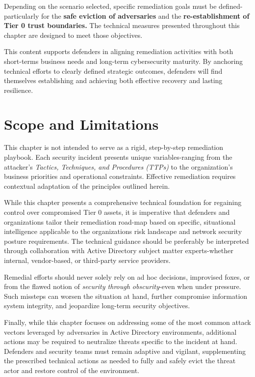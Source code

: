 Depending on the scenario selected, specific remediation goals must be defined-particularly for the \textbf{safe eviction of adversaries} and the \textbf{re-establishment of Tier 0 trust boundaries.} The technical measures presented throughout this chapter are designed to meet those objectives.

This content supports defenders in aligning remediation activities with both short-terms business needs and long-term cybersecurity maturity. By anchoring technical efforts to clearly defined strategic outcomes, defenders will find themselves establishing and achieving both effective recovery and lasting resilience.

\section{Scope and Limitations}
This chapter is not intended to serve as a rigid, step-by-step remediation playbook. Each security incident presents unique variables-ranging from the attacker's \textit{Tactics, Techniques, and Procedures (TTPs)} to the organization's business priorities and operational constraints. Effective remediation requires contextual adaptation of the principles outlined herein.

While this chapter presents a comprehensive technical foundation for regaining control over compromised Tier 0 assets, it is imperative that defenders and organizations tailor their remediation road-map based on specific, situational intelligence applicable to the organizations risk landscape and network security posture requirements. The technical guidance should be preferably be interpreted through collaboration with Active Directory subject matter experts-whether internal, vendor-based, or third-party service providers.

Remedial efforts should never solely rely on ad hoc decisions, improvised foxes, or from the flawed notion of \textit{security through obscurity}-even when under pressure. Such missteps can worsen the situation at hand, further compromise information system integrity, and jeopardize long-term security objectives.

Finally, while this chapter focuses on addressing some of the most common attack vectors leveraged by adversaries in Active Directory environments, additional actions may be required to neutralize threats specific to the incident at hand. Defenders and security teams must remain adaptive and vigilant, supplementing the prescribed technical actions as needed to fully and safely evict the threat actor and restore control of the environment.

